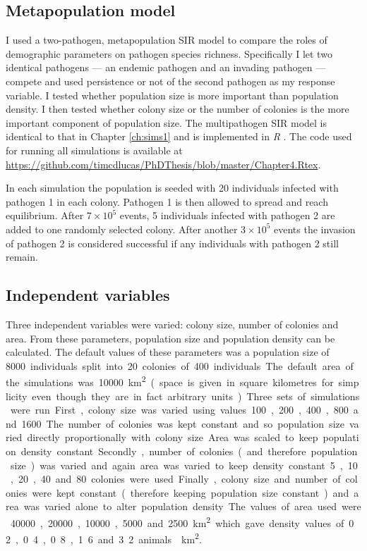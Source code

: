 \subsection{Metapopulation model}



I used a two-pathogen, metapopulation SIR model to compare the roles of demographic parameters on pathogen species richness.
Specifically I let two identical pathogens --- an endemic pathogen and an invading pathogen --- compete and used persistence or not of the second pathogen as my response variable.
I tested whether population size is more important than population density.
I then tested whether colony size or the number of colonies is the more important component of population size.
The multipathogen SIR model is identical to that in Chapter \ref{ch:sims1} and is implemented in \emph{R} \cite{R}.
The code used for running all simulations is available at \url{https://github.com/timcdlucas/PhDThesis/blob/master/Chapter4.Rtex}.


In each simulation the population is seeded with 20 individuals infected with pathogen 1 in each colony. 
Pathogen 1 is then allowed to spread and reach equilibrium. 
After \ensuremath{7\times 10^{5}} events, 5 individuals infected with pathogen 2 are added to one randomly selected colony. 
After another \ensuremath{3\times 10^{5}} events the invasion of pathogen 2 is considered successful if any individuals with pathogen 2 still remain.

\subsection{Independent variables}

Three independent variables were varied: colony size, number of colonies and area.
From these parameters, population size and population density can be calculated.
The default values of these parameters was a population size of \SI{8000} individuals split into 20 colonies of 400 individuals.
The default area of the simulations was \SI{10000}{\square\kilo\metre} (space is given in square kilometres for simplicity even though they are in fact arbitrary units).

Three sets of simulations were run.
First, colony size was varied using values 100, 200, 400, 800 and \SI{1600}.
The number of colonies was kept constant and so population size varied directly proportionally with colony size.
Area was scaled to keep population density constant. 
Secondly, number of colonies (and therefore population size) was varied and again area was varied to keep density constant.
5, 10, 20, 40 and 80 colonies were used.
Finally, colony size and number of colonies were kept constant (therefore keeping population size constant) and area was varied alone to alter population density. 
The values of area used were \SI{40000}, \SI{20000}, \SI{10000}, \SI{5000} and \SI{2500}{\square\kilo\metre} which gave density values of 0.2, 0.4, 0.8, 1.6 and 3.2 animals.\si{\per\square\kilo\metre}.

